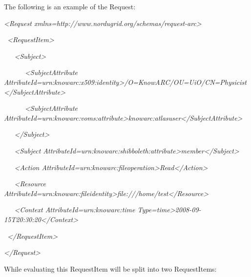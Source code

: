 \documentclass{article}
\begin{document}
{\color{black}
The following is an example of the Request:}

{\itshape\color{black}
{\textless}Request
xmlns={\textquotedbl}http://www.nordugrid.org/schemas/request-arc{\textquotedbl}{\textgreater}}

{\color{black}
\textit{\ }\textit{{\textless}RequestItem{\textgreater}}}

{\color{black}
\textit{\ \ \ }\textit{{\textless}Subject{\textgreater}}}

{\color{black}
\textit{\ \ \ \ \ \ }\textit{{\textless}SubjectAttribute
AttributeId={\textquotedbl}urn:knowarc:x509:identity{\textquotedbl}{\textgreater}/O=KnowARC/OU=UiO/CN=Physicist{\textless}/SubjectAttribute{\textgreater}}}

{\color{black}
\textit{\ \ \ \ \ \ }\textit{{\textless}SubjectAttribute
AttributeId={\textquotedbl}urn:knowarc:voms:attribute{\textgreater}knowarc:atlasuser{\textless}/SubjectAttribute{\textgreater}}}

{\color{black}
\textit{\ \ \ }\textit{{\textless}/Subject{\textgreater}}}

{\color{black}
\textit{\ \ \ }\textit{{\textless}Subject
AttributeId={\textquotedbl}urn:knowarc:shibboleth:attribute{\textquotedbl}{\textgreater}member{\textless}/Subject{\textgreater}}}

{\color{black}
\textit{\ \ \ }\textit{{\textless}Action
AttributeId={\textquotedbl}urn:knowarc:fileoperation{\textquotedbl}{\textgreater}Read{\textless}/Action{\textgreater}}}

{\color{black}
\textit{\ \ \ }\textit{{\textless}Resource
AttributeId={\textquotedbl}urn:knowarc:fileidentity{\textgreater}file:///home/test{\textless}/Resource{\textgreater}}}

{\color{black}
\textit{\ \ \ }\textit{{\textless}Context
AttributeId={\textquotedbl}urn:knowarc:time{\textquotedbl}
Type={\textquotedbl}time{\textquotedbl}{\textgreater}2008-09-15T20:30:20{\textless}/Context{\textgreater}}}

{\color{black}
\textit{\ }\textit{{\textless}/RequestItem{\textgreater}}}

{\itshape\color{black}
{\textless}/Request{\textgreater}}

{\upshape\color{black}
While evaluating this RequestItem will be split into two RequestItems:}
\end{document}
